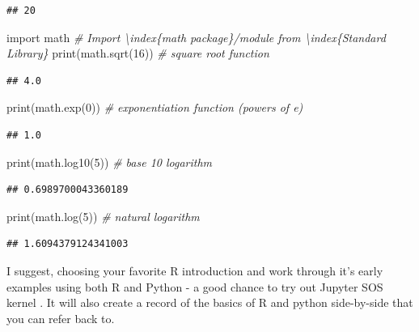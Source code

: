 \documentclass[]{book}
\newenvironment{Shaded}{\begin{snugshade}}{\end{snugshade}}
\newcommand{\DecValTok}[1]{\textcolor[rgb]{0.00,0.00,0.81}{#1}}
\newcommand{\ImportTok}[1]{#1}
\newcommand{\CommentTok}[1]{\textcolor[rgb]{0.56,0.35,0.01}{\textit{#1}}}
\newcommand{\BuiltInTok}[1]{#1}
\newcommand{\NormalTok}[1]{#1}
\theoremstyle{definition}
\theoremstyle{definition}
\theoremstyle{definition}
\theoremstyle{remark}
\begin{document}
\begin{verbatim}
## 20
\end{verbatim}

\begin{Shaded}
\begin{Highlighting}[]
\ImportTok{import}\NormalTok{ math                     }\CommentTok{# Import \textbackslash{}index\{math package\}/module from \textbackslash{}index\{Standard Library\}}
\BuiltInTok{print}\NormalTok{(math.sqrt(}\DecValTok{16}\NormalTok{))            }\CommentTok{# square root function}
\end{Highlighting}
\end{Shaded}

\begin{verbatim}
## 4.0
\end{verbatim}

\begin{Shaded}
\begin{Highlighting}[]
\BuiltInTok{print}\NormalTok{(math.exp(}\DecValTok{0}\NormalTok{))              }\CommentTok{# exponentiation function (powers of e)}
\end{Highlighting}
\end{Shaded}

\begin{verbatim}
## 1.0
\end{verbatim}

\begin{Shaded}
\begin{Highlighting}[]
\BuiltInTok{print}\NormalTok{(math.log10(}\DecValTok{5}\NormalTok{))            }\CommentTok{# base 10 logarithm}
\end{Highlighting}
\end{Shaded}

\begin{verbatim}
## 0.6989700043360189
\end{verbatim}

\begin{Shaded}
\begin{Highlighting}[]
\BuiltInTok{print}\NormalTok{(math.log(}\DecValTok{5}\NormalTok{))              }\CommentTok{# natural logarithm}
\end{Highlighting}
\end{Shaded}

\begin{verbatim}
## 1.6094379124341003
\end{verbatim}

I suggest, choosing your favorite R introduction and work through it's
early examples using both R and Python - a good chance to try out
Jupyter SOS kernel . It will also create a record of
the basics of R and python side-by-side that you can refer back to.
\end{document}
